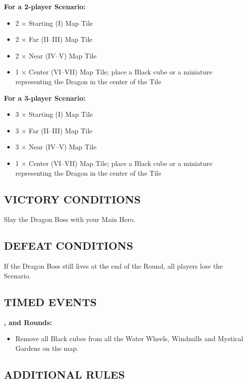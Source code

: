 \begin{multicols*}{2}
\columnbreak

\textbf{For a 2-player Scenario:}
\begin{itemize}
  \item 2 × Starting (I) Map Tile
  \item 2 × Far (II--III) Map Tile
  \item 2 × Near (IV--V) Map Tile
  \item 1 × Center (VI--VII) Map Tile; place a Black cube or a miniature representing the Dragon in the center of the Tile
\end{itemize}

\textbf{For a 3-player Scenario:}
\begin{itemize}
  \item 3 × Starting (I) Map Tile
  \item 3 × Far (II--III) Map Tile
  \item 3 × Near (IV--V) Map Tile
  \item 1 × Center (VI--VII) Map Tile; place a Black cube or a miniature representing the Dragon in the center of the Tile
\end{itemize}

\subsection*{\MakeUppercase{Victory Conditions}}
Slay the Dragon Boss with your Main Hero.

\subsection*{\MakeUppercase{Defeat Conditions}}
If the Dragon Boss still lives at the end of the  Round, all players lose the Scenario.

\subsection*{\MakeUppercase{Timed Events}}

\textbf{,  and  Rounds:}
\begin{itemize}
  \item Remove all Black cubes from all the Water Wheels, Windmills and Mystical Gardens on the map.
\end{itemize}

\subsection*{\MakeUppercase{Additional Rules}}


\end{multicols*}
